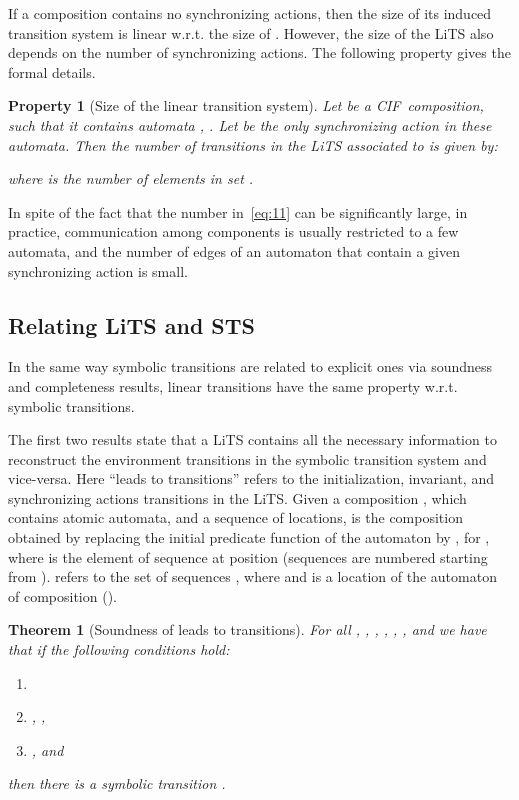 \documentclass[submission,copyright,creativecommons,sharealike]{eptcs}
\newcommand{\CIF}{{CIF}}
\newtheorem{theorem}{Theorem}
\newtheorem{prop}{Property}
\begin{document}
If a composition  contains no synchronizing actions, then the size
of its induced transition system is linear w.r.t. the size of .
However, the size of the LiTS also depends on the number of
synchronizing actions. The following property gives the formal
details.

\begin{prop}[Size of the linear transition system]
  Let  be a \CIF\ composition, such that it contains  automata
  , . Let  be the only synchronizing action in these automata.
  Then the number of transitions in the LiTS associated to  is
  given by:
  
  where  is the number of elements in set .
\end{prop}


In spite of the fact that the number in~\eqref{eq:11} can be
significantly large, in practice, communication among components is
usually restricted to a few automata, and the number of edges of an
automaton that contain a given synchronizing action  is small.



\subsection{Relating LiTS and STS}
\label{sec:relat-lits-sts}

In the same way symbolic transitions are related to explicit ones via
soundness and completeness results, linear transitions have the same
property w.r.t. symbolic transitions.

The first two results state that a LiTS contains all the necessary
information to reconstruct the environment transitions in the
symbolic transition system and vice-versa. Here ``leads
to transitions'' refers to the
initialization, invariant, and synchronizing actions transitions in
the LiTS. Given a composition , which contains  atomic automata,
and a sequence  of  locations,  is the composition
obtained by replacing the initial predicate function of the 
automaton by , for , where  is
the element of sequence  at position  (sequences are
numbered starting from ).  refers to the set of
sequences , where  and  is a location
of the  automaton of composition  ().

\begin{theorem}[Soundness of leads to transitions]
  For all , , , , , , and  we have
  that if the following conditions hold:
  \begin{enumerate}
  \item 
  \item , , 
  \item , and 
  \end{enumerate}
  then there is a symbolic transition
.
\end{theorem}
\end{document}
